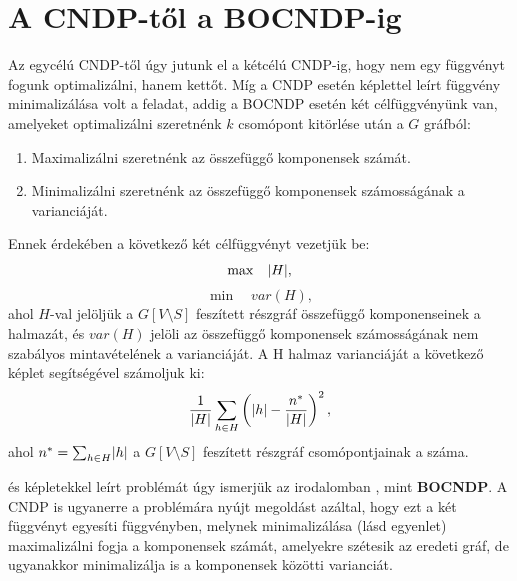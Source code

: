 \section{A CNDP-től a BOCNDP-ig}

Az egycélú CNDP-től úgy jutunk el a kétcélú CNDP-ig, hogy nem egy függvényt fogunk optimalizálni, hanem kettőt.
Míg a CNDP esetén  képlettel leírt függvény minimalizálása volt a feladat,
addig a BOCNDP esetén két célfüggvényünk van, amelyeket optimalizálni szeretnénk $k$ csomópont kitörlése után a $G$ gráfból:
\begin{enumerate}
  \item Maximalizálni szeretnénk az összefüggő komponensek számát.
  \item Minimalizálni szeretnénk az összefüggő komponensek számosságának a varianciáját.
\end{enumerate}
Ennek érdekében a következő két célfüggvényt vezetjük be:
\begin{equation}\label{eqn:MAX_CONNECTED_COMPONENTS}
  \max \quad \lvert H\rvert,
\end{equation}
\begin{equation}\label{eqn:MIN_CARDINALITY_VARIANCE_COMPONENTS}
  \min \quad var(H),
\end{equation}
ahol $H$-val jelöljük a $G\left[ V \setminus S \right]$ feszített részgráf összefüggő komponenseinek a halmazát,
és $var(H)$ jelöli az összefüggő komponensek számosságának nem szabályos mintavételének a varianciáját.
A H halmaz varianciáját a következő képlet segítségével számoljuk ki:
\begin{equation}\label{eqn:CARDINALITY_VARIANCE_COMPONENTS}
  \dfrac{1}{ \lvert H\rvert } \sum_{h \in H} \left( \lvert h\rvert - \dfrac{ n^{*} }{ \lvert H\rvert } \right)^{2},
\end{equation}
ahol $n^{*} = \sum_{h \in H} \lvert h\rvert$ a $G\left[ V \setminus S \right]$ feszített részgráf csomópontjainak a száma.

 és 
képletekkel leírt problémát úgy ismerjük az irodalomban \cite{ventresca2018bi}, mint \textbf{BOCNDP}.
A CNDP is ugyanerre a problémára nyújt megoldást azáltal,
hogy ezt a két függvényt egyesíti  függvényben,
melynek minimalizálása (lásd  egyenlet) maximalizálni fogja a komponensek számát, amelyekre szétesik az eredeti gráf,
de ugyanakkor minimalizálja is a komponensek közötti varianciát.

